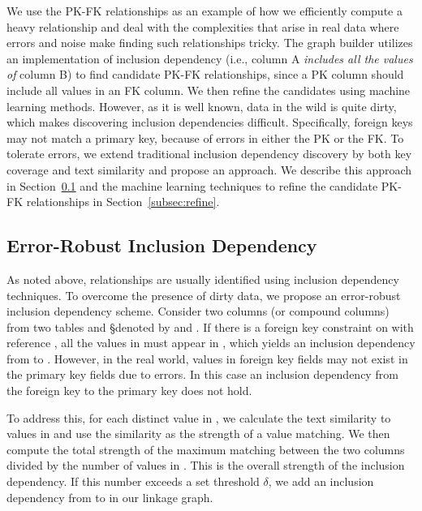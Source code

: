 We use the PK-FK relationships as an example of how we efficiently compute a
heavy relationship and deal with the complexities that arise in real data where
errors and noise make finding such relationships tricky. The graph builder
utilizes an implementation 
of inclusion dependency (i.e., column A {\it includes
all the values of} column B) to find candidate PK-FK relationships, since a PK column
should include all values in an FK column. We then refine the candidates using
machine learning methods. However, as it is well known, data in the wild is
quite dirty, which makes discovering inclusion dependencies difficult.
Specifically, foreign keys may not match a primary key, because of errors in
either the PK or the FK. To tolerate errors, we extend traditional inclusion
dependency discovery by both key coverage and text similarity and propose an
\emph{\eind} approach.  We describe this approach in Section~\ref{subsec:eind}
and the machine learning techniques to refine the candidate PK-FK relationships
in Section~\ref{subsec:refine}.

\subsection{Error-Robust Inclusion Dependency}\label{subsec:eind}

As noted above, \pkfk relationships are usually identified using inclusion
dependency techniques. To overcome the presence of dirty data, we propose an
error-robust inclusion dependency scheme.
Consider two columns (or compound columns) from two tables \R and \S denoted by
\RX and \SY. If there is a foreign key constraint on \RX with reference \SY, all
the values in \RX must appear in \SY, which yields an inclusion dependency from
\RX to \SY. However, in the real world, values in foreign key fields may not
exist in the primary key fields due to errors.  In this case an inclusion
dependency 
from the foreign key to the primary key 
does not hold.

To address this, for each distinct value in \RX, we calculate the
text similarity to values in \SY and use the similarity as the strength of a
value matching. We then compute the total strength of the maximum matching between the two columns
divided by the number of values in \RX. This is the overall strength of the
inclusion dependency.  If this number exceeds a set threshold $\delta$,
we add an inclusion dependency from \RX to \SY in our linkage graph.

